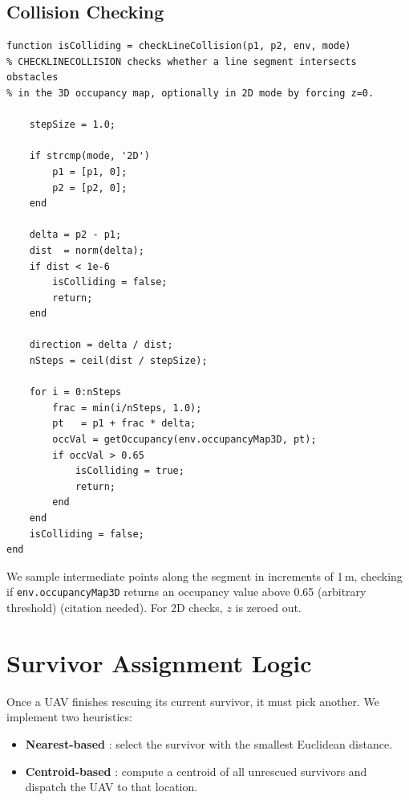 \documentclass[12pt,a4paper]{report}
\begin{document}
\subsection{Collision Checking}
\label{sec:collision_checking}
\begin{verbatim}
function isColliding = checkLineCollision(p1, p2, env, mode)
% CHECKLINECOLLISION checks whether a line segment intersects obstacles
% in the 3D occupancy map, optionally in 2D mode by forcing z=0.

    stepSize = 1.0;

    if strcmp(mode, '2D')
        p1 = [p1, 0];
        p2 = [p2, 0];
    end

    delta = p2 - p1;
    dist  = norm(delta);
    if dist < 1e-6
        isColliding = false;
        return;
    end

    direction = delta / dist;
    nSteps = ceil(dist / stepSize);

    for i = 0:nSteps
        frac = min(i/nSteps, 1.0);
        pt   = p1 + frac * delta;
        occVal = getOccupancy(env.occupancyMap3D, pt);
        if occVal > 0.65
            isColliding = true;
            return;
        end
    end
    isColliding = false;
end
\end{verbatim}
We sample intermediate points along the segment in increments of 1\,m, checking if 
\texttt{env.occupancyMap3D} returns an occupancy value above 0.65 (arbitrary threshold) 
(citation needed). For 2D checks, $z$ is zeroed out.

\section{Survivor Assignment Logic}
\label{sec:assignment_logic}

Once a UAV finishes rescuing its current survivor, it must pick another. We implement 
two heuristics:
\begin{itemize}
    \item \textbf{Nearest-based} : select the survivor with the smallest Euclidean 
          distance.
    \item \textbf{Centroid-based} : compute a centroid of all unrescued survivors 
          and dispatch the UAV to that location.
\end{itemize}
\end{document}
